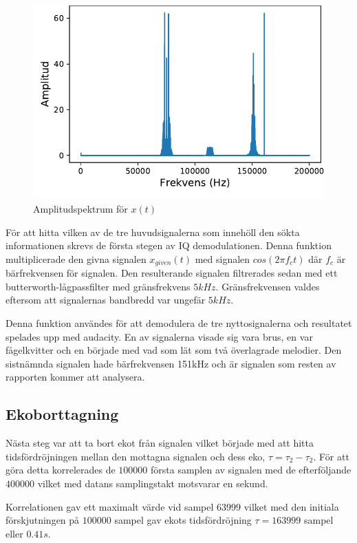 \documentclass[10pt,twocolumn]{article}
\newcommand{\echodelay}{\tau}
\begin{document}
\begin{figure}[h]
    \centering
    \includegraphics[width=0.85\linewidth]{spectrum.pdf}
    \caption{Amplitudspektrum för $x(t)$}
    \label{fig:spectrum}
\end{figure}

För att hitta vilken av de tre huvudsignalerna som innehöll den sökta informationen
skrevs de första stegen av IQ demodulationen. Denna
funktion multiplicerade den givna signalen $x_{given}(t)$ med signalen $cos(2\pi f_c t)$ där $f_c$
är bärfrekvensen för signalen. Den resulterande signalen filtrerades sedan med ett 
butterworth-lågpassfilter med gränsfrekvens $5 kHz$. Gränsfrekvensen valdes eftersom
att signalernas bandbredd var ungefär $5 kHz$.

Denna funktion användes för att demodulera de tre nyttosignalerna och resultatet spelades
upp med audacity. En av signalerna visade sig vara brus, en var fågelkvitter och en började
med vad som lät som två överlagrade melodier. Den sistnämnda signalen hade bärfrekvensen 151kHz
och är signalen som resten av rapporten kommer att analysera.

\subsection{Ekoborttagning}
Nästa steg var att ta bort ekot från signalen vilket började med att hitta tidsfördröjningen
mellan den mottagna signalen och dess eko, $\echodelay=\tau_2-\tau_2$.
För att göra detta korrelerades de $100000$ första samplen
av signalen med de efterföljande $400000$ vilket med datans samplingstakt motsvarar en sekund.

Korrelationen gav ett maximalt värde vid sampel $63999$ vilket med den initiala förskjutningen på
$100000$ sampel gav ekots tidsfördröjning $\echodelay=163999$ sampel eller $0.41s$.
\end{document}

